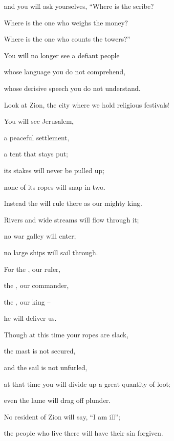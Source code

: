 {\par }{\Q and you will ask yourselves, “Where
is the scribe?
\par }{\Q Where is
the one who weighs
the money?
\par }{\Q Where is
the one
who counts
the
towers?”
\par }{\Q {}You
will no longer see
a defiant
people
\par }{\Q whose language
you do not comprehend,
\par }{\Q whose derisive
speech
you do not
understand.
\par }{\Q {}Look
at Zion,
the city
where we hold religious festivals!
\par }{\Q You will see
Jerusalem,
\par }{\Q a peaceful settlement,
\par }{\Q a tent
that stays put;

\par }{\Q its stakes
will never
be pulled up;
\par }{\Q none
of its ropes
will snap
in two.
\par }{\Q {}Instead
the {}
will rule there
as our mighty
king.

\par }{\Q Rivers
and wide
streams
will flow through
it;

\par }{\Q no
war
galley
will enter;
\par }{\Q no
large
ships
will sail through.
\par }{\Q {}For
the {}, our ruler,
\par }{\Q the {}, our commander,
\par }{\Q the {}, our king
–
\par }{\Q he will deliver us.
\par }{\Q {}Though at this time your ropes
are slack,
\par }{\Q the mast
is not
secured,
\par }{\Q and the sail
is not
unfurled,
\par }{\Q at that time
you will divide up
a great quantity
of loot;
\par }{\Q even the lame
will drag off
plunder.
\par }{\Q {}No resident
of Zion
will say,
“I am ill”;
\par }{\Q the people
who live
there will have their sin
forgiven.

}
